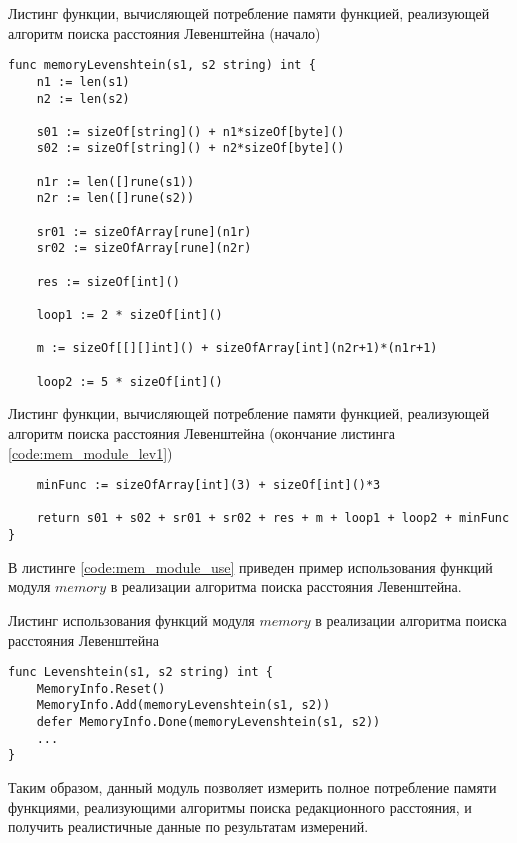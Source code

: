 \begin{code}
\caption{Листинг функции, вычисляющей потребление памяти функцией, реализующей алгоритм поиска расстояния Левенштейна (начало)}
\label{code:mem_module_lev1}

\begin{verbatim}
func memoryLevenshtein(s1, s2 string) int {
	n1 := len(s1)
	n2 := len(s2)

	s01 := sizeOf[string]() + n1*sizeOf[byte]()
	s02 := sizeOf[string]() + n2*sizeOf[byte]()

	n1r := len([]rune(s1))
	n2r := len([]rune(s2))

	sr01 := sizeOfArray[rune](n1r)
	sr02 := sizeOfArray[rune](n2r)

	res := sizeOf[int]()

	loop1 := 2 * sizeOf[int]()

	m := sizeOf[[][]int]() + sizeOfArray[int](n2r+1)*(n1r+1)
	
	loop2 := 5 * sizeOf[int]()
\end{verbatim}
\end{code}

\begin{code}
\caption{Листинг функции, вычисляющей потребление памяти функцией, реализующей алгоритм поиска расстояния Левенштейна (окончание листинга \ref{code:mem_module_lev1})}
\label{code:mem_module_lev2}

\begin{verbatim}
	minFunc := sizeOfArray[int](3) + sizeOf[int]()*3

	return s01 + s02 + sr01 + sr02 + res + m + loop1 + loop2 + minFunc
}
\end{verbatim}
\end{code}

В листинге \ref{code:mem_module_use} приведен пример использования функций модуля $memory$ в реализации алгоритма поиска расстояния Левенштейна.

\begin{code}
\caption{Листинг использования функций модуля $memory$ в реализации алгоритма поиска расстояния Левенштейна}
\label{code:mem_module_use}

\begin{verbatim}
func Levenshtein(s1, s2 string) int {
	MemoryInfo.Reset()
	MemoryInfo.Add(memoryLevenshtein(s1, s2))
	defer MemoryInfo.Done(memoryLevenshtein(s1, s2))
	...
}
\end{verbatim}
\end{code}

Таким образом, данный модуль позволяет измерить полное потребление памяти функциями, реализующими алгоритмы поиска редакционного расстояния, и получить реалистичные данные по результатам измерений.


